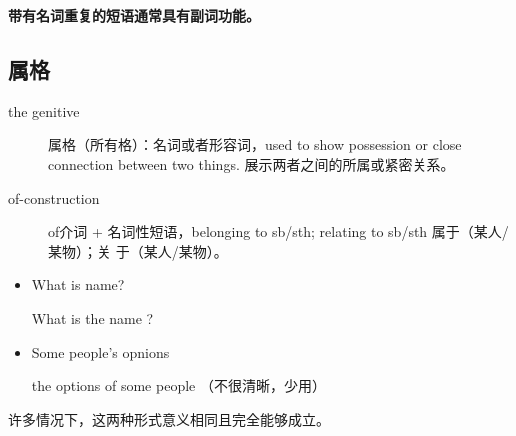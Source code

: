 \textbf{带有名词重复的短语通常具有副词功能。}

\subsection{属格}

\begin{description}
\item[the genitive] 属格（所有格）：名词或者形容词，used to show possession or
  close connection between two things. 展示两者之间的所属或紧密关系。
\item[of-construction] of介词 + 名词性短语，belonging to sb/sth; relating to sb/sth 属于（某人/某物）；关
  于（某人/某物）。
\end{description}

\begin{itemize}
\item What is  name?

  What is the name ?

\item Some people's opnions

  the options of some people （不很清晰，少用）
\end{itemize}
许多情况下，这两种形式意义相同且完全能够成立。

